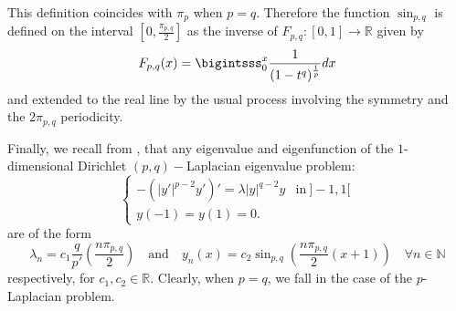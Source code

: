 \documentclass{amsart}
\theoremstyle{definition}
\theoremstyle{remark}
\newcommand{\R}{\mathbb{R}}
\newcommand{\N}{\mathbb{N}}
\begin{document}
This definition coincides with $\pi_p$ when $p=q$. %
Therefore the function $\sin_{p,q}$ is defined on the interval $[0,\frac{\pi_{p,q}}2]$ as the inverse of $F_{p,q}:[0,1]\to\R$ given by 
\[
F_{p,q}(x)=\bigintsss_0^x\frac 1{(1-t^q)^\frac 1p}dx
\]
 and extended to the real line by the usual process involving the symmetry and the $2\pi_{p,q}$ periodicity.

Finally, we recall from \cite[Thm. 3.3]{LE}, that any eigenvalue and eigenfunction of the $1$-dimensional Dirichlet $(p,q)-$Laplacian eigenvalue problem:
\begin{equation}
\label{eig_pq_1D}
\left\{
\begin{array}{ll}
-(|y'|^{p-2}y')' =\lambda |y|^{q-2}y& \text{in}\ ]-1,1[\\[.4cm]
y(-1)=y(1)=0.
\end{array}
\right.
\end{equation}
are of the form 
\[
\lambda_n=c_1\frac{q}{p'}\left(\frac{n \pi_{p,q} }2\right)\quad\text{and}\quad y_n(x)=c_2\sin_{p,q}\left(\frac{n \pi_{p,q}}2(x+1)\right)\quad \forall n\in\N
\]
respectively, for $c_1,c_2\in\R$. Clearly, when $p=q$, we fall in the case of the $p$-Laplacian problem.
 
\end{document}
